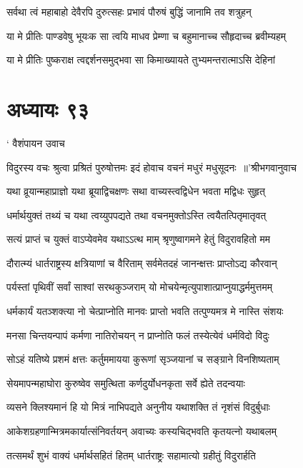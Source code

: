 \twolineshloka
{सर्वथा त्वं महाबाहो देवैरपि दुरुत्सहः}
{प्रभावं पौरुषं बुद्धिं जानामि तव शत्रुहन्}


\twolineshloka
{या मे प्रीतिः पाण्डवेषु भूयःक सा त्वयि माधव}
{प्रेम्णा च बहुमानाच्च सौहृदाच्च ब्रवीम्यहम्}


\twolineshloka
{या मे प्रीतिः पुष्कराक्ष त्वद्दर्शनसमुद्भवा}
{सा किमाख्यायते तुभ्यमन्तरात्माऽसि देहिनां}


\chapter{अध्यायः ९३}
\twolineshloka
{` वैशंपायन उवाच}
{}


\threelineshloka
{विदुरस्य वचः श्रुत्वा प्रश्रितं पुरुषोत्तमः}
{इदं होवाच वचनं मधुरं मधुसूदनः ॥'श्रीभगवानुवाच}
{}


\twolineshloka
{यथा व्रूयान्महाप्राज्ञो यथा ब्रूयाद्विचक्षणः}
{सथा वाच्यस्त्वद्विधेन भवता मद्विधः सुहृत्}


\twolineshloka
{धर्मार्थयुक्तं तथ्यं च यथा त्वय्युपपद्यते}
{तथा वचनमुक्तोऽस्ति त्वयैतत्पितृमातृवत्}


\twolineshloka
{सत्यं प्राप्तं च युक्तं वाऽप्येवमेव यथाऽऽत्थ माम्}
{श्रृणुष्वागमने हेतुं विदुरावहितो मम}


\twolineshloka
{दौरात्म्यं धार्तराष्ट्रस्य क्षत्रियाणां च वैरिताम्}
{सर्वमेतदहं जानन्क्षत्तः प्राप्तोऽद्य कौरवान्}


\twolineshloka
{पर्यस्तां पृथिवीं सर्वां साश्वां सरथकुञ्जराम्}
{यो मोचयेन्मृत्युपाशात्प्राप्नुयाद्धर्ममुत्तमम्}


\twolineshloka
{धर्मकार्यं यतञ्शक्त्या नो चेत्प्राप्नोति मानवः}
{प्राप्तो भवति तत्पुण्यमत्र मे नास्ति संशयः}


\twolineshloka
{मनसा चिन्तयन्पापं कर्मणा नातिरोचयन्}
{न प्राप्नोति फलं तस्येत्येवं धर्मविदो विदुः}


\twolineshloka
{सोऽहं यतिष्ये प्रशमं क्षत्तः कर्तुममायया}
{कुरूणां सृञ्जयानां च सङ्ग्राने विनशिष्यताम्}


\twolineshloka
{सेयमापन्महाघोरा कुरुष्वेव समुत्थिता}
{कर्णदुर्योधनकृता सर्वे ह्येते तदन्वयाः}


\twolineshloka
{व्यसने क्लिश्यमानं हि यो मित्रं नाभिपद्यते}
{अनुनीय यथाशक्ति तं नृशंसं विदुर्बुधाः}


\twolineshloka
{आकेशग्रहणान्मित्रमकार्यात्संनिवर्तयन्}
{अवाच्यः कस्यचिद्भवति कृतयत्नो यथाबलम्}


\twolineshloka
{तत्समर्थं शुभं वाक्यं धर्मार्थसहितं हितम्}
{धार्तराष्ट्रः सहामात्यो ग्रहीतुं विदुरार्हति}


